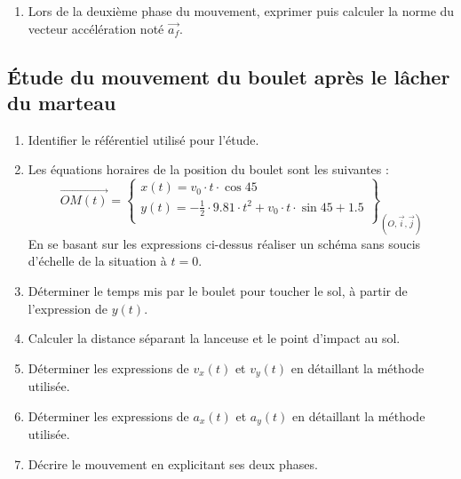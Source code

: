 \documentclass[a4paper,11pt,fleqn]{article}%
\begin{document}
	\begin{enumerate}[resume]
		\item Lors de la deuxième phase du mouvement, exprimer puis calculer la norme du vecteur accélération noté $\overrightarrow{a_f}$.
	\end{enumerate}
	
	\subsection{Étude du mouvement du boulet après le lâcher du marteau}
	
	\begin{enumerate}[resume]
		\item Identifier le référentiel utilisé pour l'étude.
		\item Les équations horaires de la position du boulet sont les suivantes : 
		$$\overrightarrow{OM(t)} = \left\lbrace \begin{array}{l}
			x(t) = v_0 \cdot t \cdot \cos{45} \\
			y(t) = -\frac{1}{2} \cdot 9.81\cdot t^2+v_0 \cdot t \cdot \sin{45} +1.5 \\
		\end{array} \right\rbrace_{(O,\vec{i},\vec{j})}$$
		En se basant sur les expressions ci-dessus réaliser un schéma sans soucis d'échelle de la situation à $t=0$.
		\item Déterminer le temps mis par le boulet pour toucher le sol, à partir de l'expression de $y(t)$.
		\item Calculer la distance séparant la lanceuse et le point d'impact au sol.
		\item Déterminer les expressions de $v_x(t)$ et $v_y(t)$ en détaillant la méthode utilisée.
		\item Déterminer les expressions de $a_x(t)$ et $a_y(t)$ en détaillant la méthode utilisée.
		\item Décrire le mouvement en explicitant ses deux phases.
	\end{enumerate}
\end{document}
